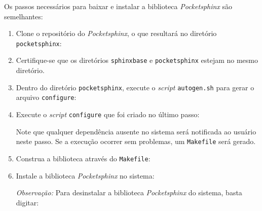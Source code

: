 Os passos necessários para baixar e instalar a biblioteca \emph{Pocketsphinx} são semelhantes:

\begin{enumerate}
\item Clone o repositório do \emph{Pocketsphinx}, o que resultará no diretório \texttt{pocketsphinx}:

\item Certifique-se que os diretórios \texttt{sphinxbase} e \texttt{pocketsphinx} estejam no mesmo diretório.

\item Dentro do diretório \texttt{pocketsphinx}, execute o \emph{script} \texttt{autogen.sh} para gerar o arquivo \texttt{configure}:

\item Execute o \emph{script} \texttt{configure} que foi criado no último passo:

Note que qualquer dependência ausente no sistema será notificada ao usuário neste passo. Se a execução ocorrer sem problemas, um \texttt{Makefile} será gerado.

\item Construa a biblioteca através do \texttt{Makefile}:

\item Instale a biblioteca \emph{Pocketsphinx} no sistema:

\emph{Observação:} Para desinstalar a biblioteca \emph{Pocketsphinx} do sistema, basta digitar:
\end{enumerate}
